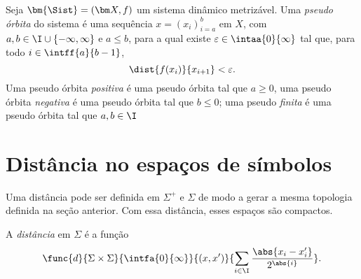 \begin{definition}
Seja $\bm{\Sist}=(\bm X,f)$ um sistema dinâmico metrizável. Uma \emph{pseudo órbita} do sistema é uma sequência $x=(x_i)_{i=a}^{b}$ em $X$, com $a,b \in \I \cup \{-\infty,\infty\}$ e $a \leq b$, para a qual existe $\varepsilon \in \intaa{0}{\infty}$ tal que, para todo $i \in \intff{a}{b-1}$,
	\begin{equation*}
	\dist{f(x_i)}{x_{i+1}} < \varepsilon.
	\end{equation*}
Uma pseudo órbita \textit{positiva} é uma pseudo órbita tal que $a \geq 0$, uma pseudo órbita \textit{negativa} é uma pseudo órbita tal que $b \leq 0$; uma pseudo \textit{finita} é uma pseudo órbita tal que $a,b \in \I$
\end{definition}

















\section{Distância no espaços de símbolos}

Uma distância pode ser definida em $\Sigma^+$ e $\Sigma$ de modo a gerar a mesma topologia definida na seção anterior. Com essa distância, esses espaços são compactos.

\begin{definition}
A \emph{distância} em $\Sigma$ é a função
	\begin{align*}
	\func{d}{\Sigma \times \Sigma}{\intfa{0}{\infty}}{(x,x')}{\sum_{i \in \I}\frac{\abs{x_i-x'_i}}{2^{\abs{i}}}}.
	\end{align*}
\end{definition}


